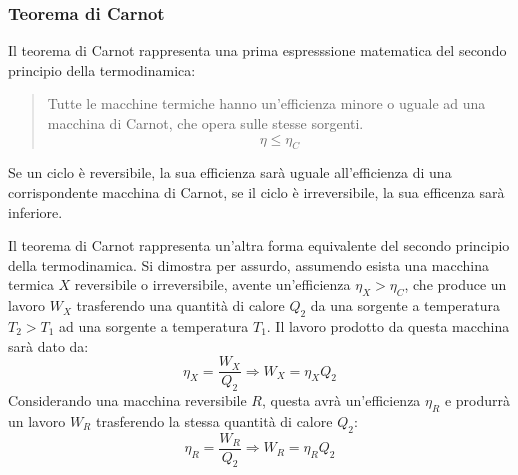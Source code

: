 \documentclass{article}
\numberwithin{equation}{subsection}
\begin{document}
\subsubsection{Teorema di Carnot}
Il teorema di Carnot rappresenta una prima espresssione matematica del secondo principio della termodinamica: 
\begin{quotation}
    Tutte le macchine termiche hanno un'efficienza minore o uguale ad una macchina di Carnot, che opera sulle stesse sorgenti. 
    \begin{equation}
        \eta\leq\eta_C
    \end{equation}
\end{quotation}
Se un ciclo è reversibile, la sua efficienza sarà uguale all'efficienza di una corrispondente macchina di Carnot, 
se il ciclo è irreversibile, la sua efficenza sarà inferiore. 


Il teorema di Carnot rappresenta un'altra forma equivalente del secondo principio della termodinamica. Si dimostra per assurdo, assumendo esista una macchina termica $X$ 
reversibile o irreversibile, avente un'efficienza $\eta_X>\eta_C$, che produce 
un lavoro $W_X$ trasferendo una quantità di calore $Q_2$ da una sorgente a temperatura $T_2>T_1$ ad una sorgente a temperatura $T_1$. 
Il lavoro prodotto da questa macchina sarà dato da: 
\begin{equation*}
    \eta_X=\displaystyle\frac{W_X}{Q_2}\Rightarrow W_X=\eta_XQ_2
\end{equation*}
Considerando una macchina reversibile $R$, questa avrà un'efficienza $\eta_R$ e produrrà un lavoro $W_R$ trasferendo la stessa quantità di calore $Q_2$: 
\begin{equation*}
    \eta_R=\displaystyle\frac{W_R}{Q_2}\Rightarrow W_R=\eta_RQ_2
\end{equation*}
\end{document}
